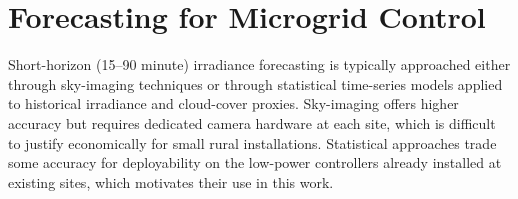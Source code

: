 \section{Forecasting for Microgrid Control}
Short-horizon (15--90 minute) irradiance forecasting is typically approached either through
sky-imaging techniques or through statistical time-series models applied to historical
irradiance and cloud-cover proxies. Sky-imaging offers higher accuracy but requires dedicated
camera hardware at each site, which is difficult to justify economically for small rural
installations. Statistical approaches trade some accuracy for deployability on the low-power
controllers already installed at existing sites, which motivates their use in this work.
